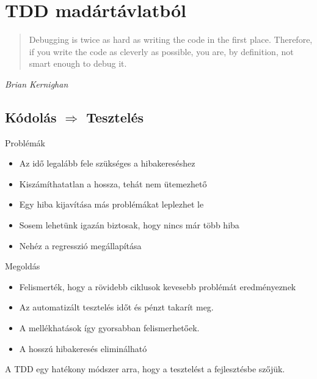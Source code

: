 \section{TDD madártávlatból}

\begin{frame}{}
  \begin{quote}
    Debugging is twice as hard as writing the code in the first
    place. Therefore, if you write the code as cleverly as possible,
    you are, by definition, not smart enough to debug it.
  \end{quote}
\textit{Brian Kernighan}
\end{frame}

\subsection{Kódolás $\Rightarrow$ Tesztelés}

\begin{frame}{Problémák}
  \begin{itemize}[<+->]
  \item Az idő legalább fele szükséges a hibakereséshez
  \item Kiszámíthatatlan a hossza, tehát nem ütemezhető
  \item Egy hiba kijavítása más problémákat leplezhet le
  \item Sosem lehetünk igazán biztosak, hogy nincs már több hiba
  \item Nehéz a regresszió megállapítása
  \end{itemize}
\end{frame}

\begin{frame}{Megoldás}
  \begin{itemize}[<+->]
  \item Felismerték, hogy a rövidebb ciklusok kevesebb problémát eredményeznek
  \item Az automatizált tesztelés időt és pénzt takarít meg.
  \item A mellékhatások így gyorsabban felismerhetőek.
  \item A hosszú hibakeresés eliminálható
  \end{itemize}

  \pause
  A TDD egy hatékony módszer arra, hogy a tesztelést a fejlesztésbe szőjük.
\end{frame}

